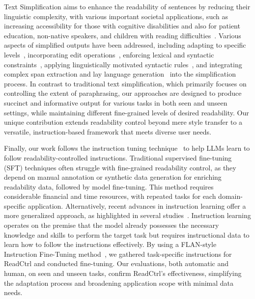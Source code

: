 \documentclass[11pt]{article}
\begin{document}
Text Simplification aims to enhance the readability of sentences by reducing their linguistic complexity, with various important societal applications, such as increasing accessibility for those with cognitive disabilities and also for patient education, non-native speakers, and children with reading difficulties~\cite{martin2020muss,cao2020expertise}.
Various aspects of simplified outputs have been addressed, including 
adapting to specific levels~\cite{nishihara2019controllable},
incorporating edit operations~\cite{kumar2020iterative,mallinson2020felix}, 
enforcing lexical and syntactic constraints~\cite{martin2019controllable}, 
applying linguistically motivated syntactic rules~\cite{maddela2020controllable}, 
and integrating complex span extraction and lay language generation~\cite{chen2018natural, kwon2022medjex,jiang2024medreadme,yao2023readme}
into the simplification process.
In contrast to traditional text simplification, which primarily focuses on controlling the extent of paraphrasing, our approaches are designed to produce succinct and informative output for various tasks in both seen and unseen settings, while maintaining different fine-grained levels of desired readability. Our unique contribution extends readability control beyond mere style transfer to a versatile, instruction-based framework that meets diverse user needs.


Finally, our work follows the instruction tuning technique~\cite{zhang2023instruction} to help LLMs learn to follow readability-controlled instructions. 
Traditional supervised fine-tuning (SFT) techniques often struggle with fine-grained readability control, as they depend on manual annotation or synthetic data generation for enriching readability data, followed by model fine-tuning. 
This method requires considerable financial and time resources, with repeated tasks for each domain-specific application. 
Alternatively, recent advances in instruction learning offer a more generalized approach, as highlighted in several studies~\cite{wei2021finetuned,wang2022self,honovich2022unnatural,zhang2023alpacare,tran2023bioinstruct}.
Instruction learning operates on the premise that the model already possesses the necessary knowledge and skills to perform the target task but requires instructional data to learn how to follow the instructions effectively.
By using a FLAN-style Instruction Fine-Tuning method~\cite{wei2021finetuned}, we gathered task-specific instructions for ReadCtrl and conducted fine-tuning. Our evaluations, both automatic and human, on seen and unseen tasks, confirm ReadCtrl's effectiveness, simplifying the adaptation process and broadening application scope with minimal data needs.
\end{document}
